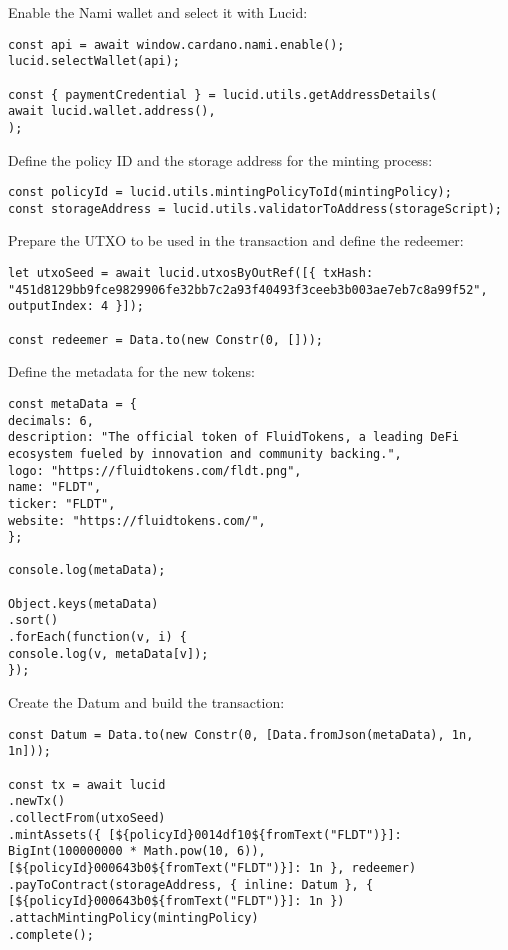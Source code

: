 Enable the Nami wallet and select it with Lucid:

\begin{lstlisting}
const api = await window.cardano.nami.enable();
lucid.selectWallet(api);

const { paymentCredential } = lucid.utils.getAddressDetails(
await lucid.wallet.address(),
);
\end{lstlisting}

Define the policy ID and the storage address for the minting process:

\begin{lstlisting}
const policyId = lucid.utils.mintingPolicyToId(mintingPolicy);
const storageAddress = lucid.utils.validatorToAddress(storageScript);
\end{lstlisting}

Prepare the UTXO to be used in the transaction and define the redeemer:

\begin{lstlisting}
let utxoSeed = await lucid.utxosByOutRef([{ txHash: "451d8129bb9fce9829906fe32bb7c2a93f40493f3ceeb3b003ae7eb7c8a99f52", outputIndex: 4 }]);

const redeemer = Data.to(new Constr(0, []));
\end{lstlisting}

Define the metadata for the new tokens:

\begin{lstlisting}
const metaData = {
decimals: 6,
description: "The official token of FluidTokens, a leading DeFi ecosystem fueled by innovation and community backing.",
logo: "https://fluidtokens.com/fldt.png",
name: "FLDT",
ticker: "FLDT",
website: "https://fluidtokens.com/",
};

console.log(metaData);

Object.keys(metaData)
.sort()
.forEach(function(v, i) {
console.log(v, metaData[v]);
});
\end{lstlisting}

Create the Datum and build the transaction:

\begin{lstlisting}
const Datum = Data.to(new Constr(0, [Data.fromJson(metaData), 1n, 1n]));

const tx = await lucid
.newTx()
.collectFrom(utxoSeed)
.mintAssets({ [${policyId}0014df10${fromText("FLDT")}]: BigInt(100000000 * Math.pow(10, 6)), [${policyId}000643b0${fromText("FLDT")}]: 1n }, redeemer)
.payToContract(storageAddress, { inline: Datum }, { [${policyId}000643b0${fromText("FLDT")}]: 1n })
.attachMintingPolicy(mintingPolicy)
.complete();
\end{lstlisting}

